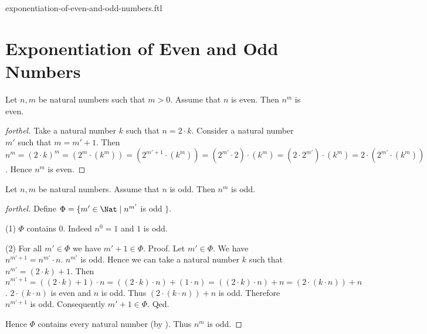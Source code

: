 \documentclass{naproche-library}
\begin{document}
\begin{smodule}{exponentiation-of-even-and-odd-numbers.ftl}

  \section*{Exponentiation of Even and Odd Numbers}

  \begin{proposition}[forthel,id=ARITHMETIC_15_1023659658745214]
    Let $n, m$ be natural numbers such that $m > 0$.
    Assume that $n$ is even.
    Then $n^{m}$ is even.
  \end{proposition}
  \begin{proof}[forthel]
    Take a natural number $k$ such that $n = 2 \cdot k$.
    Consider a natural number $m'$ such that $m = m' + 1$.
    Then $n^{m}
      = (2 \cdot k)^{m}
      = (2^{m} \cdot (k^{m}))
      = (2^{m' + 1} \cdot (k^{m}))
      = (2^{m'} \cdot 2) \cdot (k^{m})
      = (2 \cdot 2^{m'}) \cdot (k^{m})
      = 2 \cdot (2^{m'} \cdot (k^{m}))$.
    Hence $n^{m}$ is even.
  \end{proof}

  \begin{proposition}[forthel,id=ARITHMETIC_15_0021200236556985]
    Let $n, m$ be natural numbers.
    Assume that $n$ is odd.
    Then $n^{m}$ is odd.
  \end{proposition}
  \begin{proof}[forthel]
    Define $\Phi = \{ m' \in \Nat \mid n^{m'}$ is odd $\}$.

    (1) $\Phi$ contains $0$.
    Indeed $n^{0} = 1$ and $1$ is odd.

    (2) For all $m' \in \Phi$ we have $m' + 1 \in \Phi$. \newline
    Proof.
      Let $m' \in \Phi$.
      We have $n^{m' + 1} = n^{m'} \cdot n$.
      $n^{m'}$ is odd.
      Hence we can take a natural number $k$ such that $n^{m'} = (2 \cdot k) + 1$.
      Then $n^{m' + 1}
        = ((2 \cdot k) + 1) \cdot n
        = ((2 \cdot k) \cdot n) + (1 \cdot n)
        = ((2 \cdot k) \cdot n) + n
        = (2 \cdot (k \cdot n)) + n$.
      $2 \cdot (k \cdot n)$ is even and $n$ is odd.
      Thus $(2 \cdot (k \cdot n)) + n$ is odd.
      Therefore $n^{m' + 1}$ is odd.
      Consequently $m' + 1 \in \Phi$.
    Qed.

    Hence $\Phi$ contains every natural number (by ).
    Thus $n^{m}$ is odd.
  \end{proof}
\end{smodule}
\end{document}
